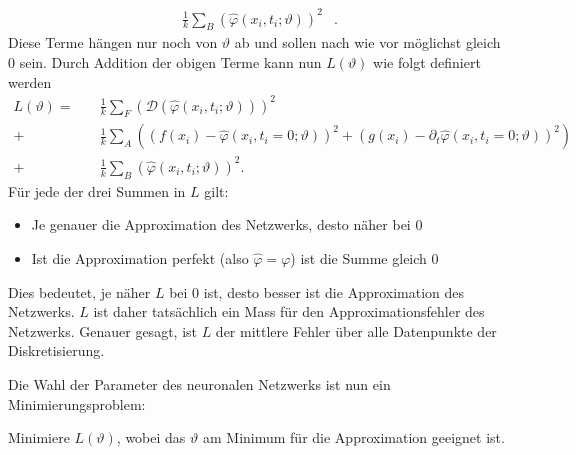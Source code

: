 \begin{equation}
    \begin{aligned}
        \frac{1}{k} \sum_{B}^{} \left(\hat{\varphi}(x_i, t_i; \vartheta)\right)^2 &.
    \end{aligned}
    \label{neuronal:randbedingung_umformuliert_netz_disk}
\end{equation}
Diese Terme hängen nur noch von $\vartheta$ ab und sollen nach wie vor möglichst gleich 0 sein.
Durch Addition der obigen Terme kann nun \( L(\vartheta) \) wie folgt definiert werden
\begin{equation}
    \begin{aligned}
        L(\vartheta) =\quad &\frac{1}{k} \sum_{F}^{} \left(\mathcal{D}(\hat{\varphi}(x_i, t_i; \vartheta))\right)^2\\
        + &\frac{1}{k} \sum_{A}^{} \left(\left(f(x_i) - \hat{\varphi}(x_i, t_i = 0; \vartheta)\right)^2
        + \left(g(x_i) - \partial_t \hat{\varphi}(x_i, t_i = 0; \vartheta)\right)^2\right)\\
        + &\frac{1}{k} \sum_{B}^{} \left(\hat{\varphi}(x_i, t_i; \vartheta)\right)^2.
    \end{aligned}
    \label{neuronal:optimierung}
\end{equation}
Für jede der drei Summen in \( L \) gilt:
\begin{itemize}
    \item Je genauer die Approximation des Netzwerks, desto näher bei 0
    \item Ist die Approximation perfekt (also \( \hat{\varphi} = \varphi \)) ist die Summe gleich 0
\end{itemize}
Dies bedeutet, je näher \( L \) bei 0 ist, desto besser ist die Approximation des Netzwerks.
$L$ ist daher tatsächlich ein Mass für den Approximationsfehler des Netzwerks.
Genauer gesagt, ist $L$ der mittlere Fehler über alle Datenpunkte der Diskretisierung.

Die Wahl der Parameter des neuronalen Netzwerks ist nun ein Minimierungsproblem:
\begin{aufgabe}
    Minimiere $L(\vartheta)$, wobei das $\vartheta$ am Minimum für die Approximation geeignet ist.
\end{aufgabe}

